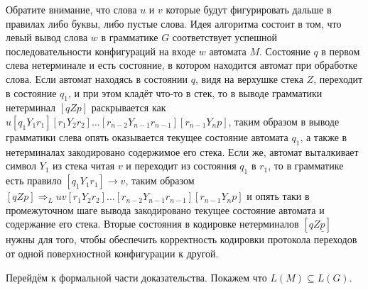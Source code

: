 \documentclass[12pt]{article}
\theoremstyle{definiton}
\theoremstyle{definition}
\theoremstyle{definition}
\let\yield\Rightarrow
\begin{document}
Обратите внимание, что слова $u$ и $v$ которые будут фигурировать дальше в правилах либо буквы, либо пустые слова.
Идея алгоритма состоит в том, что левый вывод  слова $w$ в грамматике $G$ соответствует успешной последовательности конфигураций на входе $w$ автомата $M$.  Состояние $q$ в первом слева нетерминале и есть состояние, в котором находится автомат при обработке слова. Если автомат находясь в состоянии $q$, видя на верхушке стека $Z$, переходит в состояние $q_1$, и при этом кладёт что-то в стек, то в выводе грамматики нетерминал $[qZp]$ раскрывается как $u[q_1Y_1r_1][r_1Y_2r_2]\ldots[r_{n-2}Y_{n-1}r_{n-1}][r_{n-1}Y_np]$, таким образом в выводе грамматики слева опять оказывается текущее состояние автомата $q_1$, а также в нетерминалах закодировано содержимое его стека. Если же, автомат выталкивает символ $Y_1$ из стека читая $v$ и переходит из состояния $q_1$ в $r_1$, то в грамматике есть правило $[q_1Y_1r_1] \to v$,  таким образом $[qZp] \yield_L uv[r_1Y_2r_2]\ldots[r_{n-2}Y_{n-1}r_{n-1}][r_{n-1}Y_np]$ и опять таки в промежуточном шаге вывода закодировано текущее состояние автомата и содержание его стека. Вторые состояния в кодировке нетерминалов $[qZ\underline p]$ нужны для того, чтобы обеспечить корректность кодировки протокола переходов от одной поверхностной конфигурации к другой.


Перейдём к формальной части доказательства. Покажем что $ L(M) \subseteq L(G)$.
\end{document}
